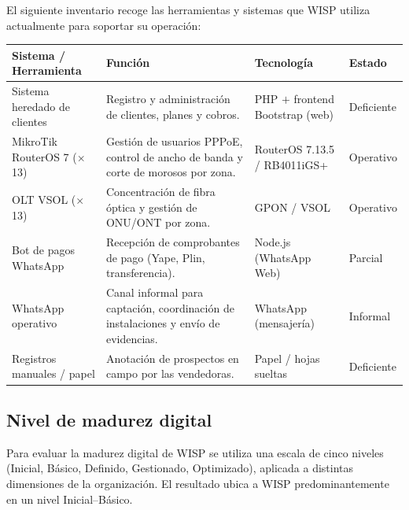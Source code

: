 El siguiente inventario recoge las herramientas y sistemas que WISP utiliza
actualmente para soportar su operación:

\begin{center}
\label{tab:inventario}
\begin{tabularx}{\textwidth}{L{2.9cm} X L{2.7cm} L{1.7cm}}
\toprule
\textbf{Sistema / Herramienta} & \textbf{Función} & \textbf{Tecnología} & \textbf{Estado} \\
\midrule
Sistema heredado de clientes &
Registro y administración de clientes, planes y cobros. &
PHP $+$ frontend Bootstrap (web) & Deficiente \\
MikroTik RouterOS 7 ($\times$13) &
Gestión de usuarios PPPoE, control de ancho de banda y corte de morosos por zona. &
RouterOS 7.13.5 / RB4011iGS+ & Operativo \\
OLT VSOL ($\times$13) &
Concentración de fibra óptica y gestión de ONU/ONT por zona. &
GPON / VSOL & Operativo \\
Bot de pagos WhatsApp &
Recepción de comprobantes de pago (Yape, Plin, transferencia). &
Node.js (WhatsApp Web) & Parcial \\
WhatsApp operativo &
Canal informal para captación, coordinación de instalaciones y envío de evidencias. &
WhatsApp (mensajería) & Informal \\
Registros manuales / papel &
Anotación de prospectos en campo por las vendedoras. &
Papel / hojas sueltas & Deficiente \\
\bottomrule
\end{tabularx}
\end{center}

\subsection{Nivel de madurez digital}

Para evaluar la madurez digital de WISP se utiliza una escala de cinco niveles
(Inicial, Básico, Definido, Gestionado, Optimizado), aplicada a distintas
dimensiones de la organización. El resultado ubica a WISP predominantemente en un
nivel Inicial--Básico.

